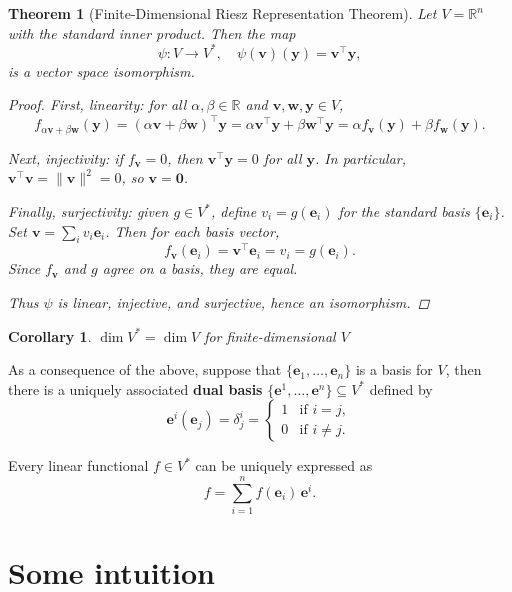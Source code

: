 \documentclass[11pt]{article}
\newtheorem{theorem}{Theorem}
\newtheorem{corollary}{Corollary}
\begin{document}
\begin{theorem}[Finite-Dimensional Riesz Representation Theorem]\label{isomorphism}
Let $V = \mathbb{R}^n$ with the standard inner product. 
Then the map
\[
\psi : V \to V^*, \quad 
\psi(\mathbf{v})(\mathbf{y}) = \mathbf{v}^\top \mathbf{y},
\]
is a vector space isomorphism.
\begin{proof}
First, linearity: for all $\alpha,\beta \in \mathbb{R}$ and $\mathbf{v},\mathbf{w},\mathbf{y} \in V$,
\[
f_{\alpha \mathbf{v} + \beta \mathbf{w}}(\mathbf{y}) 
= (\alpha \mathbf{v} + \beta \mathbf{w})^\top \mathbf{y} 
= \alpha \mathbf{v}^\top \mathbf{y} + \beta \mathbf{w}^\top \mathbf{y} 
= \alpha f_{\mathbf{v}}(\mathbf{y}) + \beta f_{\mathbf{w}}(\mathbf{y}).
\]

Next, injectivity: if $f_{\mathbf{v}} = 0$, then $\mathbf{v}^\top \mathbf{y} = 0$ for all $\mathbf{y}$.  
In particular, $\mathbf{v}^\top \mathbf{v} = \|\mathbf{v}\|^2 = 0$, so $\mathbf{v} = \mathbf{0}$.  

Finally, surjectivity: given $g \in V^*$, define $v_i = g(\mathbf{e}_i)$ for the standard basis $\{\mathbf{e}_i\}$.  
Set $\mathbf{v} = \sum_i v_i \mathbf{e}_i$. Then for each basis vector,
\[
f_{\mathbf{v}}(\mathbf{e}_i) = \mathbf{v}^\top \mathbf{e}_i = v_i = g(\mathbf{e}_i).
\]
Since $f_{\mathbf{v}}$ and $g$ agree on a basis, they are equal.  

Thus $\psi$ is linear, injective, and surjective, hence an isomorphism.
\end{proof}
\end{theorem}
\begin{corollary}
$\dim V^* = \dim V$ for finite-dimensional $V$
\end{corollary}

As a consequence of the above, suppose that $ \{ \mathbf{e}_1, \dots, \mathbf{e}_n \} $ is a basis for $ V $, then there is a uniquely associated \textbf{dual basis} $ \{ \mathbf{e}^1, \dots, \mathbf{e}^n \} \subseteq V^* $ defined by
    \[
    \mathbf{e}^i(\mathbf{e}_j) = \delta^i_j =
    \begin{cases}
    1 & \text{if } i = j, \\
    0 & \text{if } i \ne j.
    \end{cases}
    \]
    
    Every linear functional $ f \in V^* $ can be uniquely expressed as
    \[
    f = \sum_{i=1}^n f(\mathbf{e}_i) \, \mathbf{e}^i.
    \]

\section*{\Large Some intuition}
\end{document}
